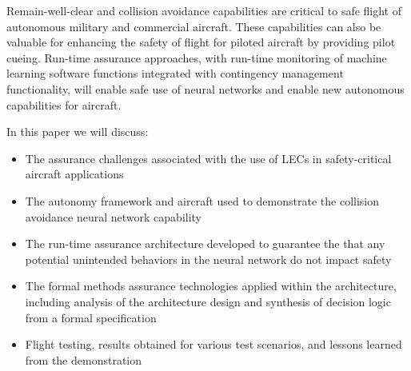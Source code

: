 Remain-well-clear and collision avoidance capabilities are critical to safe flight of autonomous
military and commercial aircraft. These capabilities can also be valuable for
enhancing the safety of flight for piloted aircraft by providing pilot cueing. Run-time assurance
approaches, with run-time monitoring of machine learning software functions integrated with
contingency management functionality, will enable safe use of neural networks and enable new
autonomous capabilities for aircraft.

In this paper we will discuss: 
\begin{itemize} 
\item The assurance challenges associated with the use of LECs in safety-critical aircraft applications 
\item The autonomy framework and aircraft used to demonstrate the collision avoidance neural network capability 
\item The run-time assurance architecture developed to guarantee the that any potential unintended behaviors in the neural network do not impact safety
\item The formal methods assurance technologies applied within the architecture, including analysis of the architecture design and synthesis of decision logic from a formal specification
\item Flight testing, results obtained for various test scenarios, and lessons learned from the
demonstration
\end{itemize}

